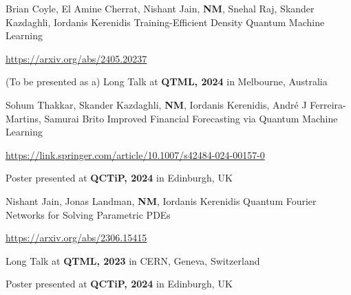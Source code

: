 

\begin{cventries}

  \cventry
    {Brian Coyle, El Amine Cherrat, Nishant Jain, \textbf{NM}, Snehal Raj, Skander Kazdaghli, Iordanis Kerenidis} %
    {Training-Efficient Density Quantum Machine Learning} %
    {} %
    {}
    {
      \begin{cvitems} %
        \item {\href{https://arxiv.org/abs/2405.20237}{https://arxiv.org/abs/2405.20237}}
        \item {(To be presented as a) Long Talk at \textbf{QTML, 2024} in Melbourne, Australia}
      \end{cvitems}
    }

  \cventry
    {Sohum Thakkar, Skander Kazdaghli, \textbf{NM}, Iordanis Kerenidis, André J Ferreira-Martins, Samurai Brito} %
    {Improved Financial Forecasting via Quantum Machine Learning} %
    {} %
    {}
    {
      \begin{cvitems} %
        \item {\href{https://link.springer.com/article/10.1007/s42484-024-00157-0}{https://link.springer.com/article/10.1007/s42484-024-00157-0}}
        \item {Poster presented at \textbf{QCTiP, 2024} in Edinburgh, UK}
      \end{cvitems}
    }

  \cventry
    {Nishant Jain, Jonas Landman, \textbf{NM}, Iordanis Kerenidis} %
    {Quantum Fourier Networks for Solving Parametric PDEs} %
    {} %
    {}
    {
      \begin{cvitems} %
        \item {\href{https://arxiv.org/abs/2306.15415}{https://arxiv.org/abs/2306.15415}}
        \item {Long Talk at \textbf{QTML, 2023} in CERN, Geneva, Switzerland}
        \item {Poster presented at \textbf{QCTiP, 2024} in Edinburgh, UK}
      \end{cvitems}
    }


\end{cventries}
